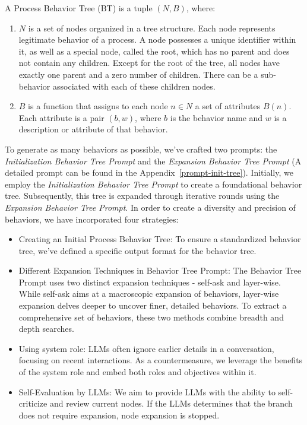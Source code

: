 \begin{definition}
A Process Behavior Tree (BT) is a tuple \((N, B)\), where:
\begin{enumerate}
    \item \(N\) is a set of nodes organized in a tree structure. Each node represents legitimate behavior of a process. A node possesses a unique identifier within it, as well as a special node, called the root, which has no parent and does not contain any children. Except for the root of the tree, all nodes have exactly one parent and a zero number of children. There can be a sub-behavior associated with each of these children nodes.
    \item \(B\) is a function that assigns to each node \(n \in N\) a set of attributes \(B(n)\). Each attribute is a pair \((b, w)\), where \(b\) is the behavior name and \(w\) is a description or attribute of that behavior. 
\end{enumerate}
\end{definition}

To generate as many behaviors as possible, we've crafted two prompts: the \textit{Initialization Behavior Tree Prompt} and the \textit{Expansion Behavior Tree Prompt} (A detailed prompt can be found in the Appendix~\ref{prompt-init-tree}). Initially, we employ the \textit{Initialization Behavior Tree Prompt} to create a foundational behavior tree. Subsequently, this tree is expanded through iterative rounds using the \textit{Expansion Behavior Tree Prompt}. In order to create a diversity and precision of behaviors, we have incorporated four strategies:
\begin{itemize}
    \item Creating an Initial Process Behavior Tree: To ensure a standardized behavior tree, we've defined a specific output format for the behavior tree.
    \item Different Expansion Techniques in Behavior Tree Prompt: The Behavior Tree Prompt uses two distinct expansion techniques - self-ask and layer-wise. While self-ask aims at a macroscopic expansion of behaviors, layer-wise expansion delves deeper to uncover finer, detailed behaviors. To extract a comprehensive set of behaviors, these two methods combine breadth and depth searches.
    \item Using system role: LLMs often ignore earlier details in a conversation, focusing on recent interactions. As a countermeasure, we leverage the benefits of the system role and embed both roles and objectives within it.
    \item Self-Evaluation by LLMs: We aim to provide LLMs with the ability to self-criticize and review current nodes. If the LLMs determines that the branch does not require expansion, node expansion is stopped.
\end{itemize}

